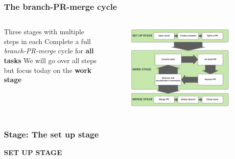 \documentclass[aspectratio=169]{beamer} %
\begin{document}
\begin{frame}
\frametitle{The branch-PR-merge cycle}

	\begin{columns}[c]

		\large Three stages with multiple steps in each
		\vspace{.7cm}\newline
		\large Complete a full \textit{branch-PR-merge} cycle for \textbf{all tasks}
		\vspace{.7cm}\newline
		\large We will go over all steps but
		focus today on the \textbf{work stage}

		\vspace{-.75cm}
		\begin{figure}
			\centering
			\includegraphics[width=\textwidth]{./img/branch-pr-merge-cycle.png}
		\end{figure}

	\end{columns}
\end{frame}

\begin{frame}
	\frametitle{Stage: The set up stage}

	\huge\centering \textbf{SET UP STAGE}

\end{frame}
\end{document}
